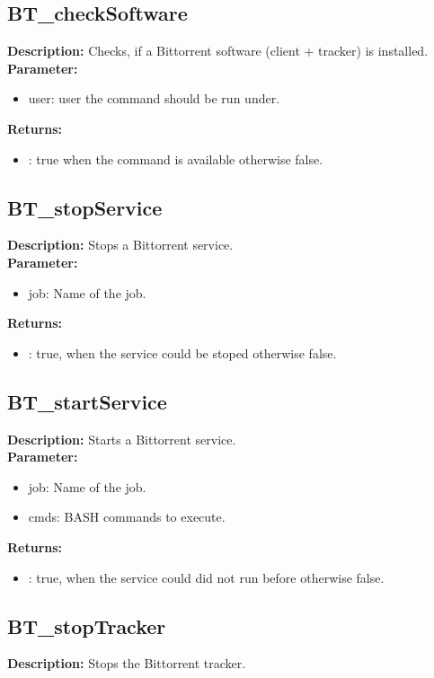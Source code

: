 \subsection{BT\_checkSoftware}
\textbf{Description:} Checks, if a Bittorrent software (client + tracker) is installed.\\
\textbf{Parameter:}
\begin{itemize}
\item user: user the command should be run under.
\end{itemize}
\textbf{Returns:}
\begin{itemize}
\item : true when the command is available otherwise false.
\end{itemize}

\subsection{BT\_stopService}
\textbf{Description:} Stops a Bittorrent service.\\
\textbf{Parameter:}
\begin{itemize}
\item job: Name of the job.
\end{itemize}
\textbf{Returns:}
\begin{itemize}
\item : true, when the service could be stoped otherwise false.
\end{itemize}

\subsection{BT\_startService}
\textbf{Description:} Starts a Bittorrent service.\\
\textbf{Parameter:}
\begin{itemize}
\item job: Name of the job.
\item cmds: BASH commands to execute.
\end{itemize}
\textbf{Returns:}
\begin{itemize}
\item : true, when the service could did not run before otherwise false.
\end{itemize}

\subsection{BT\_stopTracker}
\textbf{Description:} Stops the Bittorrent tracker.\\

